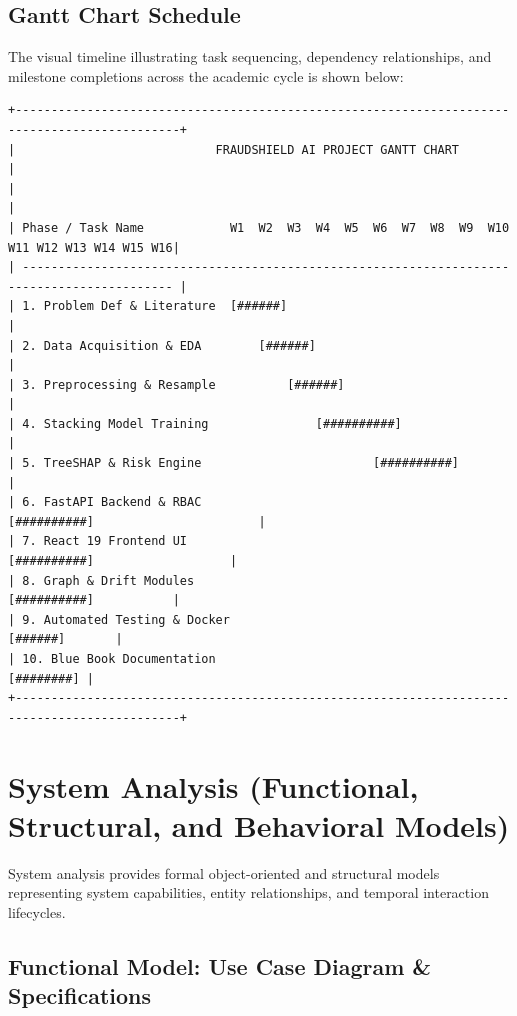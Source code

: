 \documentclass[12pt,a4paper,oneside]{report}
\begin{document}
\subsection{Gantt Chart Schedule}

The visual timeline illustrating task sequencing, dependency relationships, and milestone completions across the academic cycle is shown below:


\begin{lstlisting}
+---------------------------------------------------------------------------------------------+
|                            FRAUDSHIELD AI PROJECT GANTT CHART                               |
|                                                                                             |
| Phase / Task Name            W1  W2  W3  W4  W5  W6  W7  W8  W9  W10 W11 W12 W13 W14 W15 W16|
| ------------------------------------------------------------------------------------------- |
| 1. Problem Def & Literature  [######]                                                       |
| 2. Data Acquisition & EDA        [######]                                                   |
| 3. Preprocessing & Resample          [######]                                               |
| 4. Stacking Model Training               [##########]                                       |
| 5. TreeSHAP & Risk Engine                        [##########]                               |
| 6. FastAPI Backend & RBAC                                [##########]                       |
| 7. React 19 Frontend UI                                      [##########]                   |
| 8. Graph & Drift Modules                                             [##########]           |
| 9. Automated Testing & Docker                                                [######]       |
| 10. Blue Book Documentation                                                      [########] |
+---------------------------------------------------------------------------------------------+
\end{lstlisting}


\section{System Analysis (Functional, Structural, and Behavioral Models)}

System analysis provides formal object-oriented and structural models representing system capabilities, entity relationships, and temporal interaction lifecycles.


\subsection{Functional Model: Use Case Diagram \& Specifications}
\end{document}
